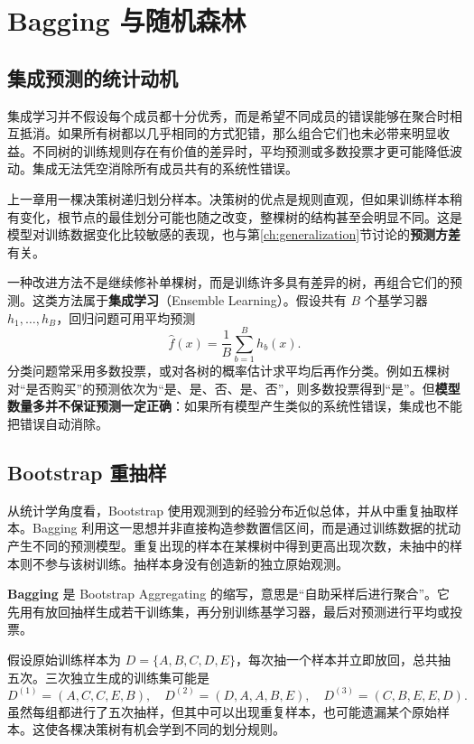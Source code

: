 \section{Bagging 与随机森林}\label{ch:random-forest}

\subsection{集成预测的统计动机}

集成学习并不假设每个成员都十分优秀，而是希望不同成员的错误能够在聚合时相互抵消。如果所有树都以几乎相同的方式犯错，那么组合它们也未必带来明显收益。不同树的训练规则存在有价值的差异时，平均预测或多数投票才更可能降低波动。集成无法凭空消除所有成员共有的系统性错误。

上一章用一棵决策树递归划分样本。决策树的优点是规则直观，但如果训练样本稍有变化，根节点的最佳划分可能也随之改变，整棵树的结构甚至会明显不同。这是模型对训练数据变化比较敏感的表现，也与第\ref{ch:generalization}节讨论的\textbf{预测方差}有关。

一种改进方法不是继续修补单棵树，而是训练许多具有差异的树，再组合它们的预测。这类方法属于\textbf{集成学习}（Ensemble Learning）\cite[第8章]{zhou2016}。假设共有 $B$ 个基学习器 $h_1,\ldots,h_B$，回归问题可用平均预测
\begin{equation}\label{eq:ensemble-average}
\hat f(x)=\frac1B\sum_{b=1}^{B}h_b(x).
\end{equation}
分类问题常采用多数投票，或对各树的概率估计求平均后再作分类。例如五棵树对“是否购买”的预测依次为“是、是、否、是、否”，则多数投票得到“是”。但\textbf{模型数量多并不保证预测一定正确}：如果所有模型产生类似的系统性错误，集成也不能把错误自动消除。

\subsection{Bootstrap 重抽样}

从统计学角度看，Bootstrap 使用观测到的经验分布近似总体，并从中重复抽取样本。Bagging 利用这一思想并非直接构造参数置信区间，而是通过训练数据的扰动产生不同的预测模型。重复出现的样本在某棵树中得到更高出现次数，未抽中的样本则不参与该树训练。抽样本身没有创造新的独立原始观测。

\textbf{Bagging} 是 Bootstrap Aggregating 的缩写，意思是“自助采样后进行聚合”。它先用有放回抽样生成若干训练集，再分别训练基学习器，最后对预测进行平均或投票\cite[第8章]{james2023}。

假设原始训练样本为 $D=\{A,B,C,D,E\}$，每次抽一个样本并立即放回，总共抽五次。三次独立生成的训练集可能是
\[
D^{(1)}=(A,C,C,E,B),\quad
D^{(2)}=(D,A,A,B,E),\quad
D^{(3)}=(C,B,E,E,D).
\]
虽然每组都进行了五次抽样，但其中可以出现重复样本，也可能遗漏某个原始样本。这使各棵决策树有机会学到不同的划分规则。

